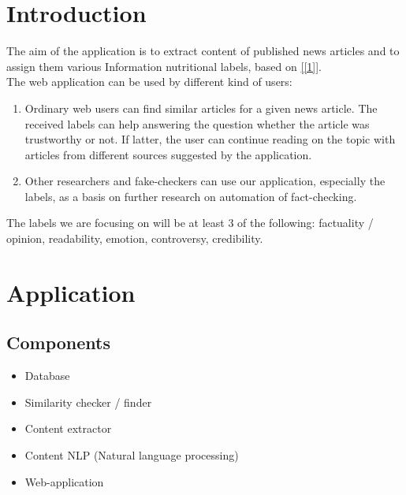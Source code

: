 \documentclass[10pt]{article}
\begin{document}
\begin{multicols}{2}


\section{Introduction}
The aim of the application is to extract content of published news articles and to assign them various \grqq{} Information nutritional labels\grqq{}, based on \ref{[1]}.\\
The web application can be used by different kind of users:
\begin{enumerate}
\item Ordinary web users can find similar articles for a given news article. The received labels can help answering the question whether the article was trustworthy or not. If latter, the user can continue reading on the topic with articles from different sources suggested by the application.
\item Other researchers and fake-checkers can use our application, especially the labels, as a basis on further research on automation of fact-checking.
\end{enumerate}
The labels we are focusing on will be at least 3 of the following: factuality / opinion, readability, emotion, controversy, credibility.


\section{Application}
\subsection{Components}
\begin{itemize}
\item Database
\item Similarity checker / finder
\item Content extractor
\item Content NLP (Natural language processing)
\item Web-application
\end{itemize}

\end{multicols}
\end{document}
